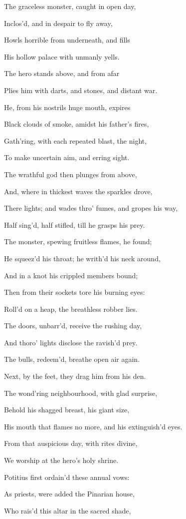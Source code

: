 The graceless monster, caught in open day,

Inclos’d, and in despair to fly away,

Howls horrible from underneath, and fills

His hollow palace with unmanly yells.

The hero stands above, and from afar

Plies him with darts, and stones, and distant war.

He, from his nostrils huge mouth, expires

Black clouds of smoke, amidst his father’s fires,

Gath’ring, with each repeated blast, the night,

To make uncertain aim, and erring sight.

The wrathful god then plunges from above,

And, where in thickest waves the sparkles drove,

There lights; and wades thro’ fumes, and gropes his way,

Half sing’d, half stifled, till he grasps his prey.

The monster, spewing fruitless flames, he found;

He squeez’d his throat; he writh’d his neck around,

And in a knot his crippled members bound;

Then from their sockets tore his burning eyes:

Roll’d on a heap, the breathless robber lies.

The doors, unbarr’d, receive the rushing day,

And thoro’ lights disclose the ravish’d prey.

The bulls, redeem’d, breathe open air again.

Next, by the feet, they drag him from his den.

The wond’ring neighbourhood, with glad surprise,

Behold his shagged breast, his giant size,

His mouth that flames no more, and his extinguish’d eyes.

From that auspicious day, with rites divine,

We worship at the hero’s holy shrine.

Potitius first ordain’d these annual vows:

As priests, were added the Pinarian house,

Who rais’d this altar in the sacred shade,

